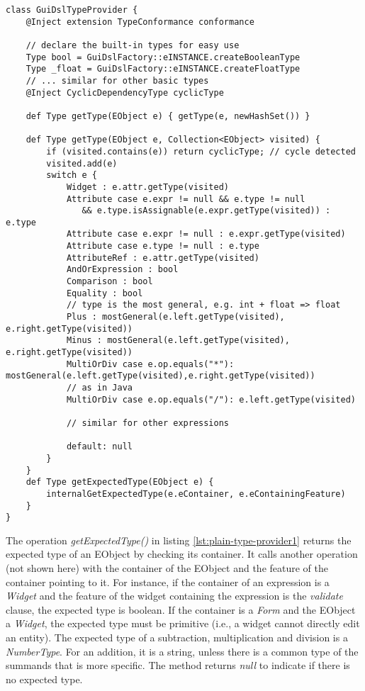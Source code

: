 
%

\begin{lstlisting}[language=xtend,float=tb,label=lst:plain-type-provider1,caption=Type provider in Xtend.] 
class GuiDslTypeProvider {
	@Inject extension TypeConformance conformance
	
	// declare the built-in types for easy use
	Type bool = GuiDslFactory::eINSTANCE.createBooleanType
	Type _float = GuiDslFactory::eINSTANCE.createFloatType
	// ... similar for other basic types
	@Inject CyclicDependencyType cyclicType

	def Type getType(EObject e) { getType(e, newHashSet()) }
	
	def Type getType(EObject e, Collection<EObject> visited) {
		if (visited.contains(e)) return cyclicType; // cycle detected
		visited.add(e)
		switch e {
			Widget : e.attr.getType(visited)
			Attribute case e.expr != null && e.type != null 
			   && e.type.isAssignable(e.expr.getType(visited)) : e.type
			Attribute case e.expr != null : e.expr.getType(visited)
			Attribute case e.type != null : e.type
			AttributeRef : e.attr.getType(visited)
			AndOrExpression : bool 
			Comparison : bool
			Equality : bool
			// type is the most general, e.g. int + float => float
			Plus : mostGeneral(e.left.getType(visited), e.right.getType(visited))
			Minus : mostGeneral(e.left.getType(visited), e.right.getType(visited))
			MultiOrDiv case e.op.equals("*"): mostGeneral(e.left.getType(visited),e.right.getType(visited))
			// as in Java
			MultiOrDiv case e.op.equals("/"): e.left.getType(visited)
			
			// similar for other expressions

			default: null
		}
	} 
	def Type getExpectedType(EObject e) {
		internalGetExpectedType(e.eContainer, e.eContainingFeature) 
	} 
}
\end{lstlisting}

The operation \emph{getExpectedType()} in listing \ref{lst:plain-type-provider1}
returns the expected type of an EObject by checking its container. It calls
another operation (not shown here) with the container of the EObject and the
feature of the container pointing to it. For instance, if the container of an
expression is a \emph{Widget} and the feature of the widget containing the
expression is the \emph{validate} clause, the expected type is boolean. If the
container is a \emph{Form} and the EObject a \emph{Widget}, the expected type
must be primitive (i.e., a widget cannot directly edit an entity).
The expected type of a subtraction, multiplication and division is a
\emph{NumberType}. For an addition, it is a string, unless there is a common
type of the summands that is more specific. The method returns \emph{null} to
indicate if there is no expected type.

